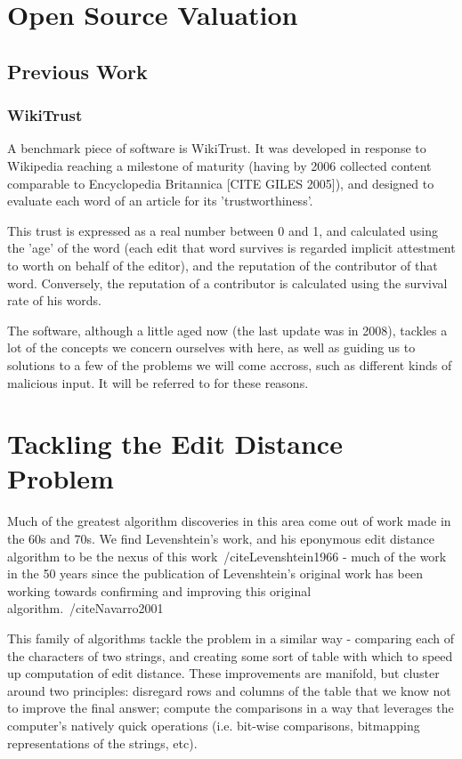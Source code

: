\documentclass[a4paper,11pt,twoside,notitlepage]{report}
\begin{document}
        \section{Open Source Valuation}
        \subsection{Previous Work}
        \subsubsection{WikiTrust}
        A benchmark piece of software is WikiTrust. It was developed
        in response to Wikipedia reaching a milestone of maturity
        (having by 2006 collected content comparable to Encyclopedia
        Britannica [CITE GILES 2005]), and designed to evaluate each
        word of an article for its 'trustworthiness'.

        This trust is expressed as a real number between 0 and 1, and
        calculated using the 'age' of the word (each edit that word
        survives is regarded implicit attestment to worth on behalf of
        the editor), and the reputation of the contributor of that
        word. Conversely, the reputation of a contributor is
        calculated using the survival rate of his words.

        The software, although a little aged now (the last update was
        in 2008), tackles a lot of the concepts we concern ourselves
        with here, as well as guiding us to solutions to a few of the
        problems we will come accross, such as different kinds of
        malicious input. It will be referred to for these reasons.
        
	\section{Tackling the Edit Distance Problem}
        Much of the greatest algorithm discoveries in this area come
        out of work made in the 60s and 70s. We find Levenshtein's
        work, and his eponymous edit distance algorithm to be the nexus of
        this work~/cite{Levenshtein1966} - much of the work in the 50 years since the
        publication of Levenshtein's original work has been working
        towards confirming and improving this original algorithm.~/cite{Navarro2001}

        This family of algorithms tackle the problem in a similar way
        - comparing each of the characters of two strings, and
        creating some sort of table with which to speed up computation
        of edit distance. These improvements are manifold, but
        cluster around two principles: disregard rows and columns of
        the table that we know not to improve the final answer;
        compute the comparisons in a way that leverages the computer's
        natively quick operations (i.e. bit-wise comparisons,
        bitmapping representations of the strings, etc).
\end{document}
